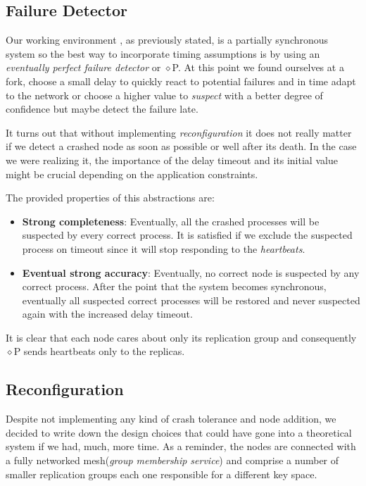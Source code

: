 \documentclass[a4paper, 11pt]{article}
\begin{document}
\subsection{Failure Detector}

Our working environment , as previously stated, is a partially synchronous system so the best way to incorporate timing assumptions is by using an \textit{eventually perfect failure detector} or $\diamond$P. At this point we found ourselves at a fork, choose a small delay to quickly react to potential failures and in time adapt to the network or choose a higher value to \textit{suspect} with a better degree of confidence but maybe detect the failure late. \par

It turns out that without implementing \textit{reconfiguration} it does not really matter if we detect a crashed node as soon as possible or well after its death. In the case we were realizing it, the importance of the delay timeout and its initial value might be crucial depending on the application constraints.

The provided properties of this abstractions are:
\begin{itemize}
	\item \textbf{Strong completeness}: Eventually, all the crashed processes will be suspected by every correct process. It is satisfied if we exclude the suspected process on timeout since it will stop responding to the \textit{heartbeats}.
	\item \textbf{Eventual strong accuracy}: Eventually, no correct node is suspected by any correct process. After the point that the system becomes synchronous, eventually all suspected correct processes will be restored and never suspected again with the increased delay timeout.
\end{itemize}

It is clear that each node cares about only its replication group and consequently $\diamond$P sends heartbeats only to the replicas. 

\subsection{Reconfiguration}

Despite not implementing any kind of crash tolerance and node addition, we decided to write down the design choices that could have gone into a theoretical system if we had, much, more time. As a reminder, the nodes are connected with a fully networked mesh(\textit{group membership service}) and comprise a number of smaller replication groups each one responsible for a different key space. \par
\end{document}

